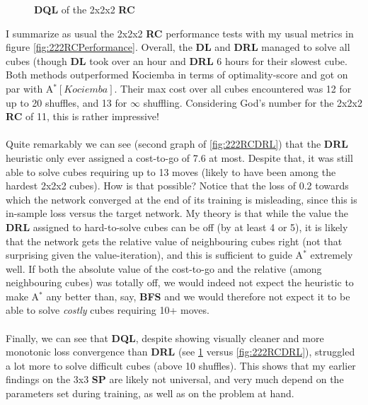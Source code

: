 \begin{figure}[H]
  \noindent
  \caption[222RCDQL]{\textbf{DQL} of the 2x2x2 \textbf{RC}}
  \label{fig:222RCDQL}
\end{figure}





I summarize as usual the 2x2x2 \textbf{RC} performance tests with my usual metrics in figure \ref{fig:222RCPerformance}. Overall, the \textbf{DL} and \textbf{DRL} managed to solve all cubes (though \textbf{DL} took over an hour and \textbf{DRL} 6 hours for their slowest cube. Both methods outperformed Kociemba in terms of optimality-score and got on par with A$^{*}[Kociemba]$. Their max cost over all cubes encountered was 12 for up to 20 shuffles, and 13 for $\infty$ shuffling. Considering God's number for the 2x2x2 \textbf{RC} of 11, this is rather impressive!
\\
\\
Quite remarkably we can see (second graph of \ref{fig:222RCDRL}) that the \textbf{DRL} heuristic only ever assigned a cost-to-go of 7.6 at most. Despite that, it was still able to solve cubes requiring up to 13 moves (likely to have been among the hardest 2x2x2 cubes). How is that possible? Notice that the loss of 0.2 towards which the network converged at the end of its training is misleading, since this is in-sample loss versus the target network. My theory is that while the value the \textbf{DRL} assigned to hard-to-solve cubes can be off (by at least 4 or 5), it is likely that the network gets the relative value of neighbouring cubes right (not that surprising given the value-iteration), and this is sufficient to guide A$^{*}$ extremely well. If both the absolute value of the cost-to-go and the relative (among neighbouring cubes) was totally off, we would indeed not expect the heuristic to make A$^{*}$ any better than, say, \textbf{BFS} and we would therefore not expect it to be able to solve \textit{costly} cubes requiring 10+ moves.
\\
\\
Finally, we can see that \textbf{DQL}, despite showing visually cleaner and more monotonic loss convergence than \textbf{DRL} (see \ref{fig:222RCDQL} versus \ref{fig:222RCDRL}), struggled a lot more to solve difficult cubes (above 10 shuffles). This shows that my earlier findings on the 3x3 \textbf{SP} are likely not universal, and very much depend on the parameters set during training, as well as on the problem at hand.

